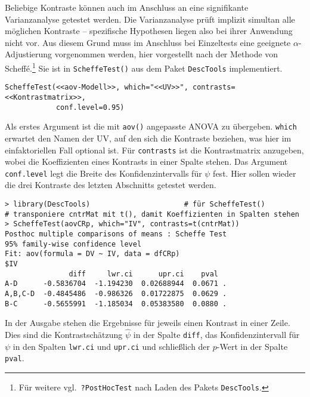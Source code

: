 Beliebige Kontraste können auch im Anschluss an eine signifikante Varianzanalyse getestet werden. Die Varianzanalyse prüft implizit simultan alle möglichen Kontraste -- spezifische Hypothesen liegen also bei ihrer Anwendung nicht vor. Aus diesem Grund muss im Anschluss bei Einzeltests eine geeignete $\alpha$-Adjustierung vorgenommen werden, hier vorgestellt nach der Methode von Scheffé.\footnote{Für weitere vgl.\ \lstinline!?PostHocTest! nach Laden des Pakets \lstinline!DescTools!.} Sie ist in \lstinline!ScheffeTest()! aus dem Paket \lstinline!DescTools! implementiert.
\begin{lstlisting}
ScheffeTest(<<aov-Modell>>, which="<<UV>>", contrasts=<<Kontrastmatrix>>,
            conf.level=0.95)
\end{lstlisting}

Als erstes Argument ist die mit \lstinline!aov()! angepasste ANOVA zu übergeben. \lstinline!which! erwartet den Namen der UV, auf den sich die Kontraste beziehen, was hier im einfaktoriellen Fall optional ist. Für \lstinline!contrasts! ist die Kontrastmatrix anzugeben, wobei die Koeffizienten eines Kontrasts in einer Spalte stehen. Das Argument \lstinline!conf.level! legt die Breite des Konfidenzintervalls für $\psi$ fest. Hier sollen wieder die drei Kontraste des letzten Abschnitts getestet werden.
\begin{lstlisting}
> library(DescTools)                      # für ScheffeTest()
# transponiere cntrMat mit t(), damit Koeffizienten in Spalten stehen
> ScheffeTest(aovCRp, which="IV", contrasts=t(cntrMat))
Posthoc multiple comparisons of means : Scheffe Test
95% family-wise confidence level
Fit: aov(formula = DV ~ IV, data = dfCRp)
$IV
               diff     lwr.ci      upr.ci    pval
A-D      -0.5836704  -1.194230  0.02688944  0.0671 .
A,B,C-D  -0.4845486  -0.986326  0.01722875  0.0629 .
B-C      -0.5655991  -1.185034  0.05383580  0.0880 .
\end{lstlisting}

In der Ausgabe stehen die Ergebnisse für jeweils einen Kontrast in einer Zeile. Dies sind die Kontrastschätzung $\hat{\psi}$ in der Spalte \lstinline!diff!, das Konfidenzintervall für $\psi$ in den Spalten \lstinline!lwr.ci! und \lstinline!upr.ci! und schließlich der $p$-Wert in der Spalte \lstinline!pval!.

